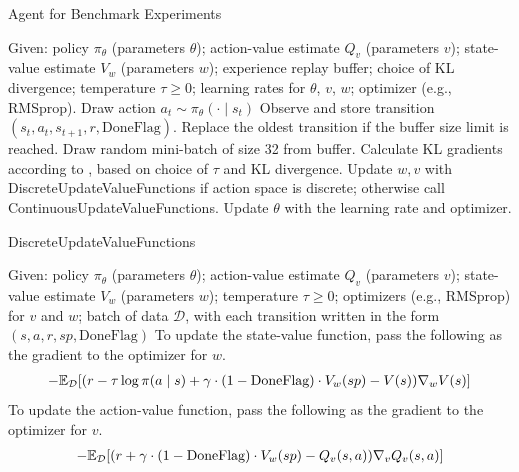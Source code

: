 \documentclass[\main/thesis.tex]{subfiles}
\begin{document}
\begin{algorithm}
\caption{Agent for Benchmark Experiments}
\label{alg:kl-agent}
\begin{algorithmic}
    \State Given: policy $\pi_\theta$ (parameters $\theta$); action-value estimate $Q_v$ (parameters $v$); state-value estimate $V_w$ (parameters $w$); experience replay buffer; choice of KL divergence; temperature $\tau \geq 0$; learning rates for $\theta$, $v$, $w$; optimizer (e.g., RMSprop).
        \State Draw action $a_t \sim \pi_\theta(\cdot \mid s_t)$
        \State Observe and store transition $(s_t, a_t, s_{t + 1}, r, \text{DoneFlag})$. Replace the oldest transition if the buffer size limit is reached. 
            \State Draw random mini-batch of size 32 from buffer. 
                \State Calculate KL gradients according to , based on choice of $\tau$ and KL divergence.
            \EndFor
            \State Update $w, v$ with DiscreteUpdateValueFunctions if action space is discrete; otherwise call ContinuousUpdateValueFunctions.
            \State Update $\theta$ with the learning rate and optimizer.
        \EndIf
    \EndFor
\end{algorithmic}
\end{algorithm}

\begin{algorithm}
\caption{DiscreteUpdateValueFunctions}
\label{alg:discrete-value-update}
\begin{algorithmic}
    \State Given: policy $\pi_\theta$ (parameters $\theta$); action-value estimate $Q_v$ (parameters $v$); state-value estimate $V_w$ (parameters $w$); temperature $\tau \geq 0$;  optimizers (e.g., RMSprop) for $v$ and $w$; batch of data $\mathcal{D}$, with each transition written in the form $(s, a, r, sp, \text{DoneFlag})$
    \State To update the state-value function, pass the following as the gradient to the optimizer for $w$. 
    \begin{align*}
        -\mathbb{E}_{\mathcal{D}}[(r - \tau \log \pi(a \mid s) + \gamma\cdot (1 - \text{DoneFlag})\cdot V_w(sp) - V(s)) \nabla_w V(s)]
    \end{align*}
    \State To update the action-value function, pass the following as the gradient to the optimizer for $v$. 
    \begin{align*}
        -\mathbb{E}_{\mathcal{D}}[(r + \gamma \cdot (1 - \text{DoneFlag})\cdot V_w(sp) - Q_v(s, a)) \nabla_v Q_v(s, a)]
    \end{align*}
\end{algorithmic}
\end{algorithm}
\end{document}
